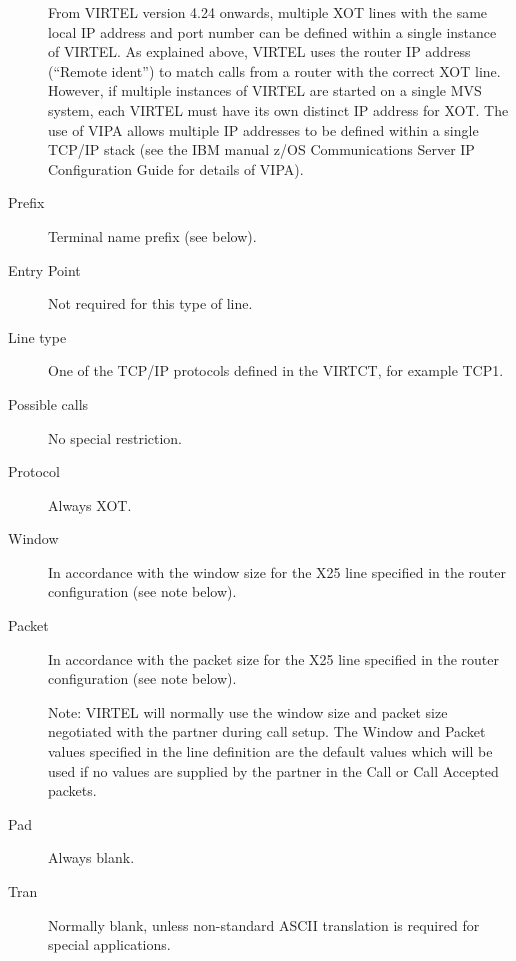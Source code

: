 \documentclass[letterpaper,10pt,english]{sphinxmanual}
\begin{document}
\begin{description}
From VIRTEL version 4.24 onwards, multiple XOT lines with the same local IP address and port number can be defined within a single instance of VIRTEL. As explained above, VIRTEL uses the router IP address (“Remote ident”) to match calls from a router with the correct XOT line. However, if multiple instances of VIRTEL are started on a single MVS system, each VIRTEL must have its own distinct IP address for XOT. The use of VIPA allows multiple IP addresses to be defined within a single TCP/IP stack (see the IBM manual z/OS Communications Server IP Configuration Guide for details of VIPA).

\item[{Prefix}] \leavevmode
Terminal name prefix (see below).

\item[{Entry Point}] \leavevmode
Not required for this type of line.

\item[{Line type}] \leavevmode
One of the TCP/IP protocols defined in the VIRTCT, for example TCP1.

\item[{Possible calls}] \leavevmode
No special restriction.

\item[{Protocol}] \leavevmode
Always XOT.

\item[{Window}] \leavevmode
In accordance with the window size for the X25 line specified in the router configuration (see note below).

\item[{Packet}] \leavevmode
In accordance with the packet size for the X25 line specified in the router configuration (see note below).

Note: VIRTEL will normally use the window size and packet size negotiated with the partner during call setup. The Window and Packet values specified in the line definition are the default values which will be used if no values are supplied by the partner in the Call or Call Accepted packets.

\item[{Pad}] \leavevmode
Always blank.

\item[{Tran}] \leavevmode
Normally blank, unless non-standard ASCII translation is required for special applications.

\end{description}

\ignorespaces 
\end{document}
